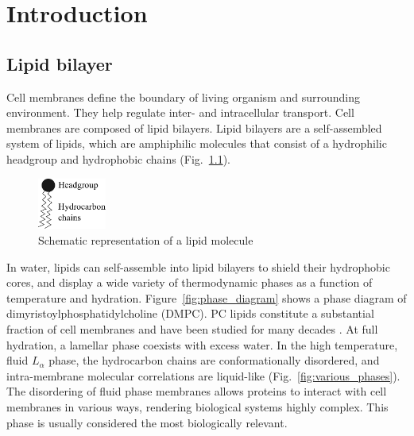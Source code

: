 \chapter{Introduction}
\section{Lipid bilayer}
Cell membranes define the boundary of living organism
and surrounding environment. They help regulate inter- and intracellular
transport. Cell membranes are composed of lipid bilayers.
Lipid bilayers are a self-assembled system of lipids, which are 
amphiphilic molecules that consist of a hydrophilic headgroup
and hydrophobic chains (Fig.~\ref{fig:lipid}).

\begin{figure}
  \centering
  \includegraphics[width=0.2\textwidth]{figures/lipid}
  \caption{Schematic representation of a lipid molecule}
  \label{fig:lipid}
\end{figure}

In water, lipids can self-assemble into lipid bilayers to shield their hydrophobic 
cores, and display a wide variety of thermodynamic phases
as a function of temperature and hydration. Figure~\ref{fig:phase_diagram}
shows a phase diagram of dimyristoylphosphatidylcholine (DMPC).
PC lipids constitute a substantial fraction of cell membranes
and have been studied for many decades \cite{ref:Nagle00}.
At full hydration, a lamellar phase coexists with excess water.
In the high temperature, fluid $L_\alpha$ phase, the hydrocarbon chains 
are conformationally disordered, and intra-membrane molecular correlations 
are liquid-like \cite{ref:Fahey78} (Fig.~\ref{fig:various_phases}).
The disordering of fluid phase membranes allows proteins to 
interact with cell membranes in various ways, rendering biological systems
highly complex. 
This phase is usually considered the most biologically relevant.

